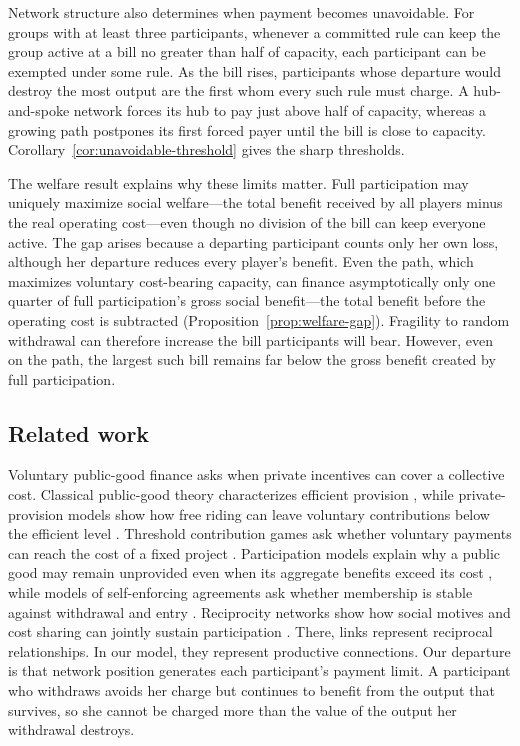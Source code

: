 \documentclass[preprint,12pt,authoryear]{elsarticle}
\begin{document}
Network structure also determines when payment becomes unavoidable. For groups
with at least three participants, whenever a committed rule can keep the group
active at a bill no greater than half of capacity, each participant can be
exempted under some rule. As the bill rises, participants whose departure would
destroy the most output are the first whom every such rule must charge. A
hub-and-spoke network forces its hub to pay just above half of capacity, whereas
a growing path postpones its first forced payer until the bill is close to
capacity.  Corollary~\ref{cor:unavoidable-threshold} gives the sharp thresholds.

The welfare result explains why these limits matter. Full participation may
uniquely maximize social welfare---the total benefit received by all players
minus the real operating cost---even though no division of the bill can keep
everyone active. The gap arises because a departing participant counts only
her own loss, although her departure reduces every player's benefit. Even the
path, which maximizes voluntary cost-bearing capacity, can finance asymptotically only one
quarter of full participation's gross social benefit---the total benefit before
the operating cost is subtracted (Proposition~\ref{prop:welfare-gap}). Fragility to random withdrawal can therefore increase the bill
participants will bear. However, even on the path, the largest such bill
remains far below the gross benefit created by full participation.

\subsection{Related work}
\label{subsec:related}

Voluntary public-good finance asks when private incentives can cover a collective cost. Classical public-good theory characterizes efficient provision \citep{Samuelson1954}, while private-provision models show how free riding can leave voluntary contributions below the efficient level \citep{BergstromBlumeVarian1986}. Threshold contribution games ask whether voluntary payments can reach the cost of a fixed project \citep{PalfreyRosenthal1984,BagnoliLipman1989}. Participation models explain why a public good may remain unprovided even when its aggregate benefits exceed its cost \citep{SaijoYamato1999,DixitOlson2000,SaijoYamato2010}, while models of self-enforcing agreements ask whether membership is stable against withdrawal and entry \citep{CarraroSiniscalco1993,Barrett1994}. Reciprocity networks show how social motives and cost sharing can jointly sustain participation \citep{DufwenbergPatel2017}. There, links represent reciprocal relationships. In our model, they represent productive connections. Our departure is that network position generates each participant’s payment limit. A participant who withdraws avoids her charge but continues to benefit from the output that survives, so she cannot be charged more than the value of the output her withdrawal destroys.
\end{document}
